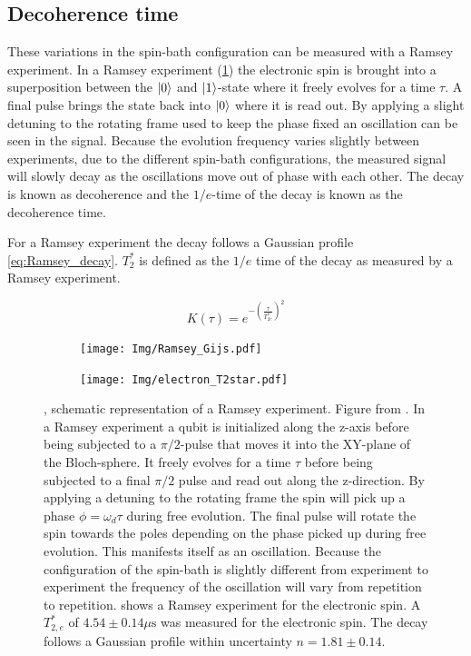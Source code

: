 \subsection{Decoherence time}
These variations in the spin-bath configuration can be measured with a Ramsey experiment.
In a Ramsey experiment (\cref{fig:Ramsey_gijs}) the electronic spin is brought into a superposition between the ${\left\vert{0}\right\rangle}$ and ${\left\vert{1}\right\rangle}$-state where it freely evolves for a time $\tau$.
A final pulse brings the state back into ${\left\vert{0}\right\rangle}$ where it is read out.
By applying a slight detuning to the rotating frame used to keep the phase fixed an oscillation can be seen in the signal.
Because the evolution frequency varies slightly between experiments, due to the different spin-bath configurations, the measured signal will slowly decay as the oscillations move out of phase with each other.
The decay is known as decoherence and the $1/e$-time of the decay is known as the decoherence time.

For a Ramsey experiment the decay follows a Gaussian profile \cref{eq:Ramsey_decay}.
$T_2^*$ is defined as the $1/e$ time of the decay as measured by a Ramsey experiment.

\begin{equation}
    K(\tau) = e^{-(\tfrac{\tau}{T_{2e}^*})^2}
    \label{eq:Ramsey_decay}
\end{equation}

\begin{figure}[htbp]
    \centering
    \begin{subfigure}[t]{0.49\textwidth}\centering
        \caption{}
        \texttt{[image: Img/Ramsey\_Gijs.pdf]}
        \label{fig:Ramsey_gijs}
    \end{subfigure}
    \begin{subfigure}[t]{0.49\textwidth}\centering
        \caption{}
        \texttt{[image: Img/electron\_T2star.pdf]}
        \label{fig:electron_T2*}
    \end{subfigure}
        \caption{
        , schematic representation of a Ramsey experiment. Figure from \citet{Lange2012Quantum}.
        In a Ramsey experiment a qubit is initialized along the z-axis before being subjected to a $\pi/2$-pulse that moves it into the XY-plane of the Bloch-sphere.
        It freely evolves for a time $\tau$ before being subjected to a final $\pi/2$ pulse and read out along the z-direction.
        By applying a detuning to the rotating frame the spin will pick up a phase $\phi = \omega_d \tau$ during free evolution.
        The final pulse will rotate the spin towards the poles depending on the phase picked up during free evolution.
        This manifests itself as an oscillation.
        Because the configuration of the spin-bath is slightly different from experiment to experiment the frequency of the oscillation will vary from repetition to repetition.
         shows a Ramsey experiment for the electronic spin.
        A $T_{2,e}^*$ of $4.54 \pm 0.14 \mu\mathrm{s}$ was measured for the electronic spin. The decay follows a Gaussian profile within uncertainty $n = 1.81 \pm 0.14$. }
\end{figure}


